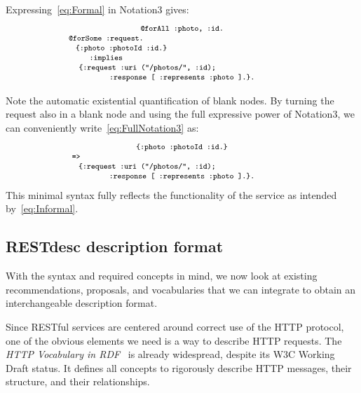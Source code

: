 \documentclass[runningheads,a4paper, twocolumn]{llncs}
\begin{document}
Expressing~\ref{eq:Formal} in Notation3 gives:
\begin{multline}\label{eq:FullNotation3}
    \makebox[2.7cm]{\fontsize{8}{10}\texttt{@forAll :photo, :id.}}\\[-.5em]
    \fontsize{8}{10}\texttt{@forSome :request.}\makebox[5.47cm]{}\\[-.5em]
    \fontsize{8}{10}\texttt{\{:photo :photoId :id.\}}\makebox[4.37cm]{}\\[-.5em]
    \fontsize{8}{10}\texttt{:implies}\makebox[5.47cm]{}\\[-.5em]
    \fontsize{8}{10}\texttt{\{:request :uri ("/photos/", :id);}\makebox[2.5cm]{}\\[-.5em]
    \makebox[5.75cm]{\fontsize{8}{10}\texttt{:response [ :represents :photo ].\}.}}
\end{multline}

Note the automatic existential quantification of blank nodes. By turning the request also in a blank node and using the full expressive power of Notation3, we can conveniently write~\ref{eq:FullNotation3} as:
\begin{multline}\label{eq:Notation3}
    \makebox[3.44cm]{\fontsize{8}{10}\texttt{\{:photo :photoId :id.\}}}\\[-.5em]
    \fontsize{8}{10}\texttt{=>}\makebox[7.6cm]{}\\[-.5em]
    \fontsize{8}{10}\texttt{\{:request :uri ("/photos/", :id);}\makebox[2.5cm]{}\\[-.5em]
    \makebox[5.75cm]{\fontsize{8}{10}\texttt{:response [ :represents :photo ].\}.}}
\end{multline}
This minimal syntax fully reflects the functionality of the service as intended by~\ref{eq:Informal}.

\subsection{RESTdesc description format}
With the syntax and required concepts in mind, we now look at existing recommendations, proposals, and vocabularies that we can integrate to obtain an interchangeable description format.

Since RESTful services are centered around correct use of the HTTP protocol, one of the obvious elements we need is a way to describe HTTP requests. The \emph{HTTP Vocabulary in RDF}~\cite{HTTPinRDF} is already widespread, despite its W3C Working Draft status. It defines all concepts to rigorously describe HTTP messages, their structure, and their relationships.
\end{document}
